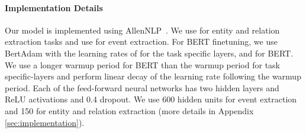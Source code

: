 \documentclass[11pt,a4paper]{article}
\begin{document}
\paragraph{Implementation Details} Our model is implemented using AllenNLP~\cite{Gardner2017AllenNLP}. We use  for entity and relation extraction tasks and use  for event extraction. 
For BERT finetuning, we use BertAdam with the learning rates of  for the task specific layers, and  for BERT. We use a longer warmup period for BERT than the warmup period for task specific-layers and perform linear decay of the learning rate following the warmup period. Each of the feed-forward neural networks has two hidden layers and ReLU activations and 0.4 dropout. We use 600 hidden units for event extraction and 150 for entity and relation extraction (more  details in Appendix \ref{sec:implementation}).
\end{document}
